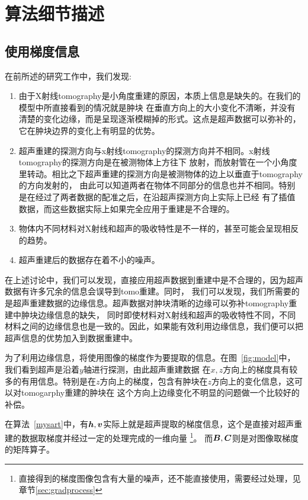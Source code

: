 \section{算法细节描述}
\subsection{使用梯度信息}\label{sec:mysart}
在前所述的研究工作中，我们发现:
\begin{enumerate}
    \item 由于X射线tomography是小角度重建的原因，本质上信息是缺失的。在我们的模型中所直接看到的情况就是肿块
    在垂直方向上的大小变化不清晰，并没有清楚的变化边缘，而是呈现逐渐模糊掉的形式。这点是超声数据可以弥补的，
    它在肿块边界的变化上有明显的优势。
    \item 超声重建的探测方向与x射线tomography的探测方向并不相同。x射线tomography的探测方向是在被测物体上方往下
    放射，而放射管在一个小角度里转动。相比之下超声重建的探测方向是被测物体的边上以垂直于tomography的方向发射的，
    由此可以知道两者在物体不同部分的信息也并不相同。特别是在经过了两者数据的配准之后，在沿超声探测方向上实际上已经
    有了插值数据，而这些数据实际上如果完全应用于重建是不合理的。
    \item 物体内不同材料对X射线和超声的吸收特性是不一样的，甚至可能会呈现相反的趋势。
    \item 超声重建后的数据存在着不小的噪声。
\end{enumerate}
在上述讨论中，我们可以发现，直接应用超声数据到重建中是不合理的，因为超声数据有许多冗余的信息会误导到tomo重建。同时，
我们可以发现，我们所需要的是超声重建数据的边缘信息。超声数据对肿块清晰的边缘可以弥补tomography重建中肿块边缘信息的缺失，
同时即使材料对X射线和超声的吸收特性不同，不同材料之间的边缘信息也是一致的。因此，如果能有效利用边缘信息，我们便可以把
超声信息的优势加入到数据重建中。

为了利用边缘信息，将使用图像的梯度作为要提取的信息。在图~\ref{fig:model}中，我们看到超声是沿着$y$轴进行探测，由此超声重建数据
在$x,z$方向上的梯度具有较多的有用信息。特别是在$z$方向上的梯度，包含有肿块在$z$方向上的变化信息，这可以对tomogarphy重建的肿块在
这个方向上边缘变化不明显的问题做一个比较好的补偿。

在算法~\ref{mysart}中，有$\bm{h},\bm{v}$实际上就是超声提取的梯度信息，这个是直接对超声重建的数据取梯度并经过一定的处理完成的一维向量
\footnote{直接得到的梯度图像包含有大量的噪声，还不能直接使用，需要经过处理，见章节\ref{sec:gradprocess}}。
而$\bm{B},\bm{C} $则是对图像取梯度的矩阵算子。
\clearpage

